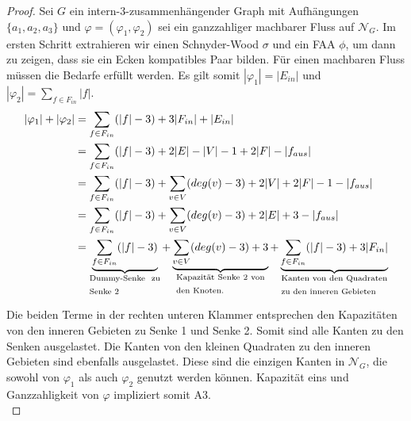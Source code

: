 \begin{proof}
Sei $G$ ein intern-3-zusammenhängender Graph mit Aufhängungen $\{a_1,a_2,a_3\}$ und $\varphi=(\varphi_1,\varphi_2)$ sei ein ganzzahliger machbarer Fluss auf $\mathcal{N}_G$. Im ersten Schritt extrahieren wir einen Schnyder-Wood $\sigma$ und ein FAA $\phi$, um dann zu zeigen, dass sie ein Ecken kompatibles Paar bilden. Für einen machbaren Fluss müssen die Bedarfe erfüllt werden. Es gilt somit $|\varphi_1| =  |E_{in}|$ und $|\varphi_2| = \sum_{f \in F_{in}} |f|$.
\begin{equation}\label{eq_sat}
\begin{split}
|\varphi_1| + |\varphi_2| & = \sum_{f \in F_{in}} (|f|-3) + 3|F_{in}| + |E_{in}|\\
		& = \sum_{f \in F_{in}} (|f|-3) + 2|E| -|V| - 1 + 2|F| - |f_{aus}|\\
		& = \sum_{f \in F_{in}} (|f|-3) + \sum_{v \in V} (deg(v)-3) + 2|V| + 2|F| - 1 - |f_{aus}|\\
		& = \sum_{f \in F_{in}} (|f|-3) + \sum_{v \in V} (deg(v)-3) + 2|E| + 3 - |f_{aus}|\\
		& = \underbrace{\sum_{f \in F_{in}}(|f|-3)  }_{\text{\parbox{8em}{Dummy-Senke zu Senke 2}}} + \underbrace{\sum_{v \in V} (deg(v)-3) +3 }_{\text{\parbox{10em}{Kapazität Senke 2 von den Knoten.}}} +\underbrace{\sum_{f \in F_{in}}(|f|-3) + 3|F_{in}|}_{\text{\parbox{12em}{Kanten von den Quadraten zu den inneren Gebieten}}}
\end{split}
\end{equation}

Die beiden Terme in der rechten unteren Klammer entsprechen den Kapazitäten von den inneren Gebieten zu Senke 1 und Senke 2. Somit sind alle Kanten zu den Senken ausgelastet. Die Kanten von den kleinen Quadraten zu den inneren Gebieten sind ebenfalls ausgelastet. Diese sind die einzigen Kanten in $\mathcal{N}_G$, die sowohl von $\varphi_1$ als auch $\varphi_2$ genutzt werden können. Kapazität eins und Ganzzahligkeit von $\varphi$ impliziert somit A3.\\


\end{proof}
